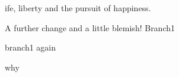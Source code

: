 \documentclass{article}
\begin{document}
ife, liberty and the pursuit of happiness.

A further change and a little blemish! Branch1

branch1 again

why
\end{document}
